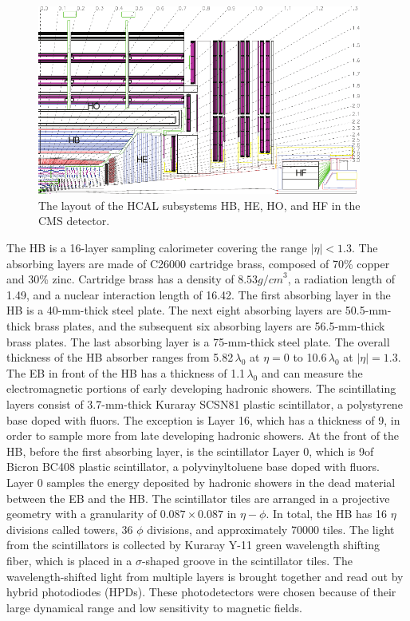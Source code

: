 \begin{figure}[hbt]
\begin{center}
\includegraphics[width=0.95\textwidth]{figures/HCAL_subdet.pdf}
\caption{The layout of the HCAL subsystems HB, HE, HO, and HF in the CMS detector.}
\label{fig:hcal-layout}
\end{center}
\end{figure}

The HB is a 16-layer sampling calorimeter covering the range $|\eta|<1.3$. The absorbing layers are made of C26000 cartridge brass, composed of 70\% copper and 30\% zinc. Cartridge brass has a density of $8.53\unit{g/cm}^3$, a radiation length of 1.49\cm, and a nuclear interaction length of 16.42\cm. The first absorbing layer in the HB is a 40-mm-thick steel plate. The next eight absorbing layers are 50.5-mm-thick brass plates, and the subsequent six absorbing layers are 56.5-mm-thick brass plates. The last absorbing layer is a 75-mm-thick steel plate. The overall thickness of the HB absorber ranges from 5.82$\,\lambda_{0}$ at $\eta=0$ to 10.6$\,\lambda_{0}$ at $|\eta|=1.3$. The EB in front of the HB has a thickness of 1.1$\,\lambda_{0}$ and can measure the electromagnetic portions of early developing hadronic showers. The scintillating layers consist of 3.7-mm-thick Kuraray SCSN81 plastic scintillator, a polystyrene base doped with fluors. The exception is Layer 16, which has a thickness of 9\mm, in order to sample more from late developing hadronic showers. At the front of the HB, before the first absorbing layer, is the scintillator Layer 0, which is 9\mm of Bicron BC408 plastic scintillator, a polyvinyltoluene base doped with fluors. Layer 0 samples the energy deposited by hadronic showers in the dead material between the EB and the HB. The scintillator tiles are arranged in a projective geometry with a granularity of $0.087\times0.087$ in $\eta-\phi$. In total, the HB has 16 $\eta$ divisions called towers, 36 $\phi$ divisions, and approximately 70000 tiles. The light from the scintillators is collected by Kuraray Y-11 green wavelength shifting fiber, which is placed in a $\sigma$-shaped groove in the scintillator tiles. The wavelength-shifted light from multiple layers is brought together and read out by hybrid photodiodes (HPDs). These photodetectors were chosen because of their large dynamical range and low sensitivity to magnetic fields.

